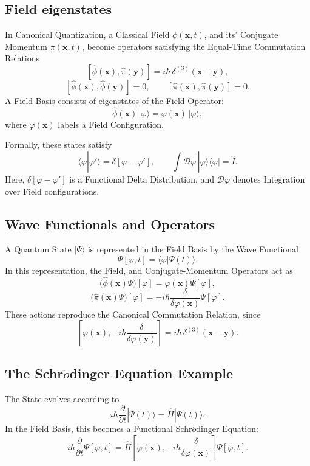 \documentclass[a4paper, 10pt, onepage]{elegantbook}
\begin{document}
\subsection{Field eigenstates}

In Canonical Quantization, a Classical Field \(\phi(\mathbf{x},t)\), and its' Conjugate Momentum \(\pi(\mathbf{x},t)\), become operators satisfying the Equal-Time Commutation Relations
\[
[\hat{\phi}(\mathbf{x}),\hat{\pi}(\mathbf{y})]
=i\hbar\,\delta^{(3)}(\mathbf{x}-\mathbf{y}),
\]
\[
[\hat{\phi}(\mathbf{x}),\hat{\phi}(\mathbf{y})]=0,
\qquad
[\hat{\pi}(\mathbf{x}),\hat{\pi}(\mathbf{y})]=0.
\]
A Field Basis consists of eigenstates of the Field Operator:
\[
\hat{\phi}(\mathbf{x})\,|\varphi\rangle
=\varphi(\mathbf{x})\,|\varphi\rangle,
\]
where \(\varphi(\mathbf{x})\) labels a Field Configuration.

Formally, these states satisfy
\[
\langle\varphi|\varphi'\rangle
=\delta[\varphi-\varphi'],
\qquad
\int\mathcal{D}\varphi\,
|\varphi\rangle\langle\varphi|=\hat{I}.
\]
Here, \(\delta[\varphi-\varphi']\) is a Functional Delta Distribution, and \(\mathcal{D}\varphi\) denotes Integration over Field configurations.

\subsection{Wave Functionals and Operators}

A Quantum State \(|\Psi\rangle\) is represented in the Field Basis by
the Wave Functional
\[
\Psi[\varphi,t]=\langle\varphi|\Psi(t)\rangle.
\]
In this representation, the Field, and Conjugate-Momentum Operators act as
\[
\bigl(\hat{\phi}(\mathbf{x})\Psi\bigr)[\varphi]
=\varphi(\mathbf{x})\Psi[\varphi],
\]
\[
\bigl(\hat{\pi}(\mathbf{x})\Psi\bigr)[\varphi]
=-i\hbar\frac{\delta}{\delta\varphi(\mathbf{x})}
\Psi[\varphi].
\]
These actions reproduce the Canonical Commutation Relation, since
\[
\left[
\varphi(\mathbf{x}),
-i\hbar\frac{\delta}{\delta\varphi(\mathbf{y})}
\right]
=i\hbar\,\delta^{(3)}(\mathbf{x}-\mathbf{y}).
\]

\subsection{The Schr$\ddot{o}$dinger Equation Example}

The State evolves according to
\[
i\hbar\frac{\partial}{\partial t}|\Psi(t)\rangle
=\hat{H}|\Psi(t)\rangle.
\]
In the Field Basis, this becomes a Functional Schr$\ddot{o}$dinger Equation:
\[
i\hbar\frac{\partial}{\partial t}\Psi[\varphi,t]
=
\hat{H}\left[
\varphi(\mathbf{x}),
-i\hbar\frac{\delta}{\delta\varphi(\mathbf{x})}
\right]\Psi[\varphi,t].
\]
\end{document}

